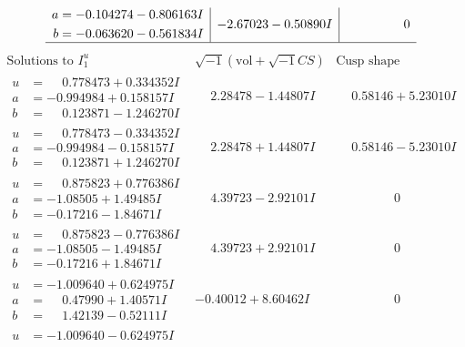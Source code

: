 \documentclass[1p]{elsarticle_modified}
\theoremstyle{definition}
\newcommand{\I}{\sqrt{-1}}
\begin{document}
$$\begin{array}{c|c|c}
\begin{aligned}
a &= -0.104274 - 0.806163 I \\
b &= -0.063620 - 0.561834 I\end{aligned}
 & -2.67023 - 0.50890 I & \phantom{-0.000000 } 0\\
 \hline 
 \end{array}$$\newpage$$\begin{array}{c|c|c}  
\text{Solutions to }I^u_{1}& \I (\text{vol} + \sqrt{-1}CS) & \text{Cusp shape}\\
 \hline 
\begin{aligned}
u &= \phantom{-}0.778473 + 0.334352 I \\
a &= -0.994984 + 0.158157 I \\
b &= \phantom{-}0.123871 - 1.246270 I\end{aligned}
 & \phantom{-}2.28478 - 1.44807 I & \phantom{-}0.58146 + 5.23010 I \\ \hline\begin{aligned}
u &= \phantom{-}0.778473 - 0.334352 I \\
a &= -0.994984 - 0.158157 I \\
b &= \phantom{-}0.123871 + 1.246270 I\end{aligned}
 & \phantom{-}2.28478 + 1.44807 I & \phantom{-}0.58146 - 5.23010 I \\ \hline\begin{aligned}
u &= \phantom{-}0.875823 + 0.776386 I \\
a &= -1.08505 + 1.49485 I \\
b &= -0.17216 - 1.84671 I\end{aligned}
 & \phantom{-}4.39723 - 2.92101 I & \phantom{-0.000000 } 0 \\ \hline\begin{aligned}
u &= \phantom{-}0.875823 - 0.776386 I \\
a &= -1.08505 - 1.49485 I \\
b &= -0.17216 + 1.84671 I\end{aligned}
 & \phantom{-}4.39723 + 2.92101 I & \phantom{-0.000000 } 0 \\ \hline\begin{aligned}
u &= -1.009640 + 0.624975 I \\
a &= \phantom{-}0.47990 + 1.40571 I \\
b &= \phantom{-}1.42139 - 0.52111 I\end{aligned}
 & -0.40012 + 8.60462 I & \phantom{-0.000000 } 0 \\ \hline\begin{aligned}
u &= -1.009640 - 0.624975 I \\

\end{aligned}
\end{array}$$
\end{document}
